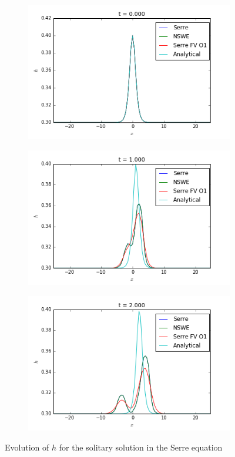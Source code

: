 \begin{figure}[h!]
	\begin{subfigure}{.3\linewidth}
		\includegraphics[scale=.3]{figures/Serre/solitary1h.png}	
	\end{subfigure}
	\begin{subfigure}{.3\linewidth}
		\includegraphics[scale=.3]{figures/Serre/solitary2h.png}	
	\end{subfigure}
	\begin{subfigure}{.3\linewidth}
		\includegraphics[scale=.3]{figures/Serre/solitary3h.png}	
	\end{subfigure}
	\caption{Evolution of $h$ for the solitary solution in the Serre equation \label{fig:solitaryh}}
\end{figure}

